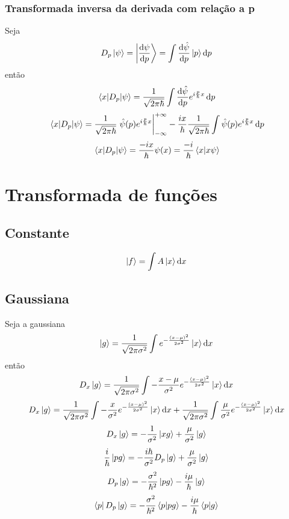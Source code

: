 \documentclass[report,14pt,openright,oneside,a4paper,brazil]{abntex2}
\newcommand{\abrir}[2]{\int{#1}\ket{#2}\dd{#2}}
\newcommand{\aqfourier}[1]{\frac{1}{\sqrt{2\pi\hbar}}\int{#1} e^{i \frac{p}{\hbar} x} \dd{p}}
\begin{document}
\subsection{Transformada inversa da derivada com relação a p}

Seja
\begin{equation}
    D_p\ket{\psi}=\ket{\dv{\psi}{p}}= \abrir{\dv{\hat{\psi}}{p} (p)}{p}
\end{equation}
então
\begin{equation}
    \matrixel{x}{D_p}{\psi}= \aqfourier{\dv{\hat\psi}{p} (p)}
\end{equation}
\begin{equation}
    \matrixel{x}{D_p}{\psi}= \frac{1}{\sqrt{2\pi \hbar}}\eval{\hat\psi(p)e^{i\frac{p}{\hbar}x}}_{-\infty}^{+\infty}- \frac{ix}{\hbar} \aqfourier{\hat\psi(p)}
\end{equation}
\begin{equation}
    \matrixel{x}{D_p}{\psi}= \frac{-ix}{\hbar} \psi(x)=\frac{-i}{\hbar} \braket{x}{x\psi}
\end{equation}

\chapter{Transformada de funções}

\section{Constante}
$$\ket{f}=\abrir{A}{x}$$

\section{Gaussiana}
Seja a gaussiana
\begin{equation}
    \ket{g}=\frac{1}{\sqrt{2\pi\sigma^2}} \abrir{e^{-\frac{(x-\mu)^2}{2\sigma^2}}}{x}
\end{equation}
então
\begin{equation}
    D_x\ket{g}=\frac{1}{\sqrt{2\pi\sigma^2}} \abrir{-\frac{x-\mu}{\sigma^2} e^{-\frac{(x-\mu)^2}{2\sigma^2}}}{x}
\end{equation}
\begin{equation}
    D_x\ket{g}=\frac{1}{\sqrt{2\pi\sigma^2}} \abrir{-\frac{x}{\sigma^2} e^{-\frac{(x-\mu)^2}{2\sigma^2}}}{x}+\frac{1}{\sqrt{2\pi\sigma^2}} \abrir{\frac{\mu}{\sigma^2} e^{-\frac{(x-\mu)^2}{2\sigma^2}}}{x}
\end{equation}
\begin{equation}
    D_x\ket{g}=-\frac{1}{\sigma^2}\ket{xg}+\frac{\mu}{\sigma^2}\ket{g}
\end{equation}
\begin{equation}
    \frac{i}{\hbar}\ket{pg}=-\frac{i\hbar}{\sigma^2}D_p\ket{g}+\frac{\mu}{\sigma^2}\ket{g}
\end{equation}
\begin{equation}
    D_p\ket{g}=-\frac{\sigma^2}{\hbar^2} \ket{pg}-\frac{i\mu}{\hbar} \ket{g}
\end{equation}
\begin{equation}
    \bra{p}D_p\ket{g}=-\frac{\sigma^2}{\hbar^2} \bra{p}\ket{pg}-\frac{i\mu}{\hbar} \bra{p}\ket{g}
\end{equation}
\end{document}
